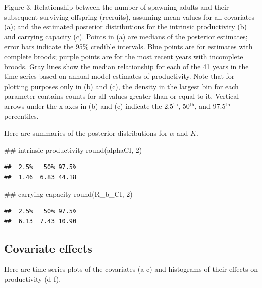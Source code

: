 \documentclass[11pt,]{article}
\newenvironment{Shaded}{}{}
\newcommand{\CommentTok}[1]{\textcolor[rgb]{0.00,0.50,0.00}{#1}}
\newcommand{\DecValTok}[1]{#1}
\newcommand{\KeywordTok}[1]{\textcolor[rgb]{0.00,0.00,1.00}{#1}}
\newcommand{\NormalTok}[1]{#1}
\begin{document}
Figure 3. Relationship between the number of spawning adults and their
subsequent surviving offspring (recruits), assuming mean values for all
covariates (a); and the estimated posterior distributions for the
intrinsic productivity (b) and carrying capacity (c). Points in (a) are
medians of the posterior estimates; error bars indicate the 95\%
credible intervals. Blue points are for estimates with complete broods;
purple points are for the most recent years with incomplete broods. Gray
lines show the median relationship for each of the 41 years in the time
series based on annual model estimates of productivity. Note that for
plotting purposes only in (b) and (c), the density in the largest bin
for each parameter contains counts for all values greater than or equal
to it. Vertical arrows under the x-axes in (b) and (c) indicate the
2.5\(^\text{th}\), 50\(^\text{th}\), and 97.5\(^\text{th}\) percentiles.

Here are summaries of the posterior distributions for \(\alpha\) and
\(K\).

\begin{Shaded}
\begin{Highlighting}[]
\CommentTok{## intrinsic productivity}
\KeywordTok{round}\NormalTok{(alphaCI, }\DecValTok{2}\NormalTok{)}
\end{Highlighting}
\end{Shaded}

\begin{verbatim}
##  2.5%   50% 97.5% 
##  1.46  6.83 44.18
\end{verbatim}

\begin{Shaded}
\begin{Highlighting}[]
\CommentTok{## carrying capacity}
\KeywordTok{round}\NormalTok{(R_b_CI, }\DecValTok{2}\NormalTok{)}
\end{Highlighting}
\end{Shaded}

\begin{verbatim}
##  2.5%   50% 97.5% 
##  6.13  7.43 10.90
\end{verbatim}

\hypertarget{covariate-effects}{%
\subsection{Covariate effects}\label{covariate-effects}}

Here are time series plots of the covariates (a-c) and histograms of
their effects on productivity (d-f).
\end{document}
